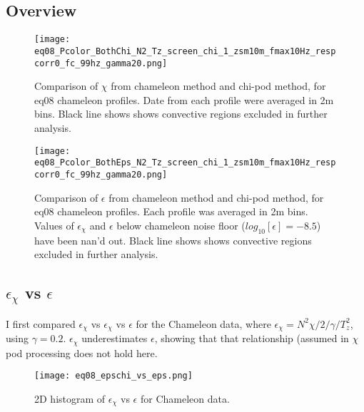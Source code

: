 \documentclass[11pt]{article}
\begin{document}
\subsection{Overview}

\begin{figure}[htbp]
\texttt{[image: eq08\_Pcolor\_BothChi\_N2\_Tz\_screen\_chi\_1\_zsm10m\_fmax10Hz\_respcorr0\_fc\_99hz\_gamma20.png]}
\caption{Comparison of $\chi$ from chameleon method and chi-pod method, for eq08 chameleon profiles. Date from each profile were averaged in 2m bins.  Black line shows shows convective regions excluded in further analysis.}
\label{chi_overview}
\end{figure}

\begin{figure}[htbp]
\texttt{[image: eq08\_Pcolor\_BothEps\_N2\_Tz\_screen\_chi\_1\_zsm10m\_fmax10Hz\_respcorr0\_fc\_99hz\_gamma20.png]}
\caption{Comparison of $\epsilon$ from chameleon method and chi-pod method, for eq08 chameleon profiles. Each profile was averaged in 2m bins.  Values of $\epsilon_{\chi}$ and $\epsilon$ below chameleon noise floor ($log_{10}[\epsilon]=-8.5$) have been nan'd out. Black line shows shows convective regions excluded in further analysis.}
\label{eps_overview}
\end{figure}






\clearpage
\subsection{$\epsilon_{\chi}$ vs $\epsilon$}

I first compared $\epsilon_{\chi}$ vs $\epsilon_{\chi}$ vs $\epsilon$ for the Chameleon data, where $\epsilon_{\chi}=N^2\chi/2/\gamma/T_{z}^{2}$, using $\gamma=0.2$. $\epsilon_{\chi}$ underestimates $\epsilon$, showing that that relationship (assumed in $\chi$pod processing does not hold here.

\begin{figure}[htbp]
\texttt{[image: eq08\_epschi\_vs\_eps.png]}
\caption{2D histogram of $\epsilon_{\chi}$ vs $\epsilon$ for Chameleon data.}
\label{}
\end{figure}







\clearpage
\end{document}
